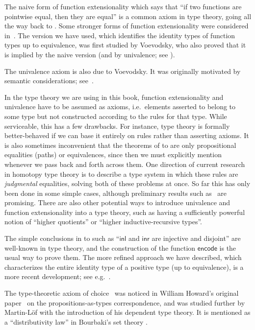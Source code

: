 \documentclass[12pt]{article}
\newcommand{\encode}{\ensuremath{\mathsf{encode}}\xspace}
\newcommand{\inl}{\ensuremath\inlsym\xspace}
\newcommand{\inlsym}{{\mathsf{inl}}}
\newcommand{\inr}{\ensuremath\inrsym\xspace}
\newcommand{\inrsym}{{\mathsf{inr}}}
\begin{document}
%
The naive form of function extensionality which says that ``if two functions are pointwise equal, then they are equal'' is a common axiom in type theory, going all the way back to \cite{PM2}.
Some stronger forms of function extensionality were considered in~\cite{garner:depprod}.
The version we have used, which identifies the identity types of function types up to equivalence, was first studied by Voevodsky, who also proved that it is implied by the naive version (and by univalence; see ).

%
The univalence axiom is also due to Voevodsky.
It was originally motivated by semantic considerations; see~\cite{klv:ssetmodel}.

In the type theory we are using in this book, function extensionality and univalence have to be assumed as axioms, i.e.\ elements asserted to belong to some type but not constructed according to the rules for that type.
While serviceable, this has a few drawbacks.
For instance, type theory is formally better-behaved if we can base it entirely on rules rather than asserting axioms.
It is also sometimes inconvenient that the theorems of  to  are only propositional equalities (paths) or equivalences, since then we must explicitly mention whenever we pass back and forth across them.
One direction of current research in homotopy type theory is to describe a type system in which these rules are \emph{judgmental} equalities, solving both of these problems at once.
So far this has only been done in some simple cases, although preliminary results such as~\cite{lh:canonicity} are promising.
There are also other potential ways to introduce univalence and function extensionality into a type theory, such as having a sufficiently powerful notion of ``higher quotients'' or ``higher inductive-recursive types''.

The simple conclusions in  to  such as ``$\inl$ and $\inr$ are injective and disjoint'' are well-known in type theory, and the construction of the function \encode is the usual way to prove them.
The more refined approach we have described, which characterizes the entire identity type of a positive type (up to equivalence), is a more recent development; see e.g.~\cite{ls:pi1s1}.

%
The type-theoretic axiom of choice~ was noticed in William Howard's original paper~\cite{howard:pat} on the propositions-as-types correspondence, and was studied further by Martin-L\"of with the introduction of his dependent type theory.  It is mentioned as a ``distributivity law'' in Bourbaki's set theory \cite{Bourbaki}.%
\end{document}
